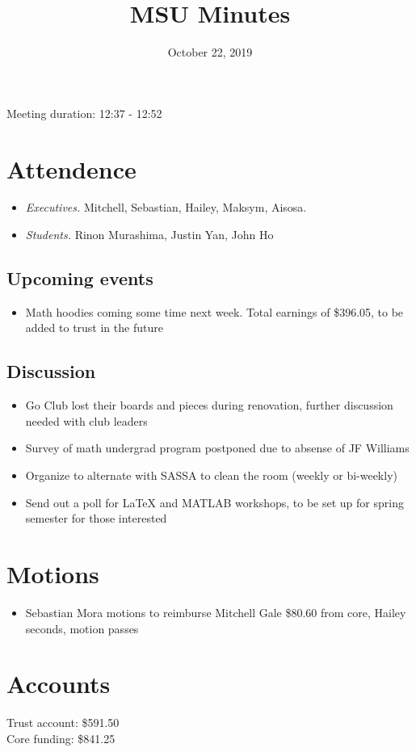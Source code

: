 \documentclass[12pt]{article}
\title{MSU Minutes}
\date{October 22, 2019}
\begin{document}
\maketitle

Meeting duration: 12:37 - 12:52

\section*{Attendence}
\begin{itemize}
\item \textit{Executives.} Mitchell, Sebastian, Hailey, Maksym, Aisosa.
\item \textit{Students.} Rinon Murashima, Justin Yan, John Ho
\end{itemize}

\subsection*{Upcoming events}
\begin{itemize}
\item Math hoodies coming some time next week. Total earnings of \$396.05, to be added to trust in the future
\end{itemize}

\subsection*{Discussion}
\begin{itemize}
\item Go Club lost their boards and pieces during renovation, further discussion needed with club leaders
\item Survey of math undergrad program postponed due to absense of JF Williams
\item Organize to alternate with SASSA to clean the room (weekly or bi-weekly)
\item Send out a poll for LaTeX and MATLAB workshops, to be set up for spring semester for those interested
\end{itemize}

\section*{Motions}
\begin{itemize}
\item Sebastian Mora motions to reimburse Mitchell Gale \$80.60 from core, Hailey seconds, motion passes
\end{itemize}

\section*{Accounts}

Trust account: \$591.50 \\
Core funding: \$841.25 \\
\end{document}
